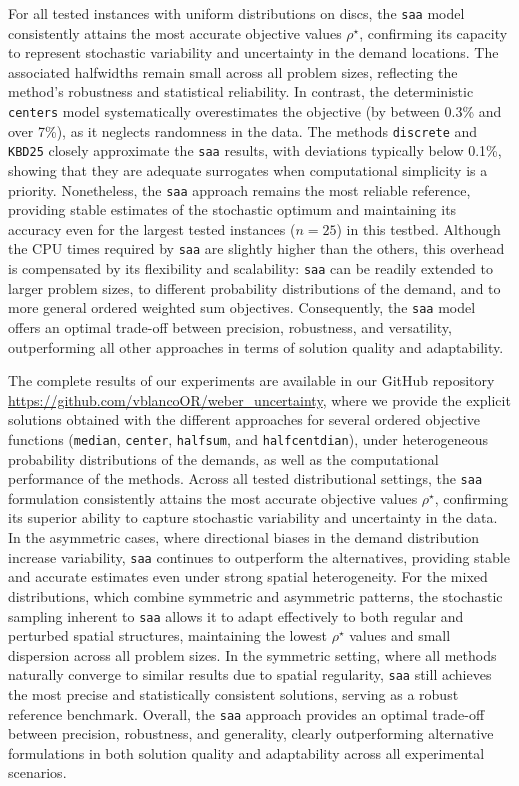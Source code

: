\documentclass[letter,11pt, reqno]{amsart}
\renewcommand{\;}{\quad}
\theoremstyle{thmstyleone}%
\theoremstyle{thmstyletwo}%
\theoremstyle{thmstylethree}%
\begin{document}
For all tested instances with uniform distributions on discs, the \texttt{saa} model consistently attains the most accurate objective values $\rho^\star$, confirming its capacity to represent stochastic variability and uncertainty in the demand locations. The associated halfwidths remain small across all problem sizes, reflecting the method’s robustness and statistical reliability. In contrast, the deterministic \texttt{centers} model systematically overestimates the objective (by between 0.3\% and over 7\%), as it neglects randomness in the data. The methods \texttt{discrete} and \texttt{KBD25}  closely approximate the \texttt{saa} results, with deviations typically below 0.1\%, showing that they are adequate surrogates when computational simplicity is a priority. Nonetheless, the \texttt{saa} approach remains the most reliable reference, providing stable estimates of the stochastic optimum and maintaining its accuracy even for the largest tested instances ($n=25$) in this testbed. Although the CPU times required by \texttt{saa} are slightly higher than the others, this overhead is compensated by its flexibility and scalability: \texttt{saa} can be readily extended to larger problem sizes, to different probability distributions of the demand, and to more general ordered weighted sum objectives. Consequently, the \texttt{saa} model offers an optimal trade-off between precision, robustness, and versatility, outperforming all other approaches in terms of solution quality and adaptability.

The complete results of our experiments are available in our GitHub repository \url{https://github.com/vblancoOR/weber_uncertainty}, where we provide the explicit solutions obtained with the different approaches for several ordered objective functions (\texttt{median}, \texttt{center}, \texttt{halfsum}, and \texttt{halfcentdian}), under heterogeneous probability distributions of the demands, as well as the computational performance of the methods. Across all tested distributional settings, the \texttt{saa} formulation consistently attains the most accurate objective values $\rho^\star$, confirming its superior ability to capture stochastic variability and uncertainty in the data. In the asymmetric cases, where directional biases in the demand distribution increase variability, \texttt{saa} continues to outperform the alternatives, providing stable and accurate estimates even under strong spatial heterogeneity. For the mixed distributions, which combine symmetric and asymmetric patterns, the stochastic sampling inherent to \texttt{saa} allows it to adapt effectively to both regular and perturbed spatial structures, maintaining the lowest $\rho^\star$ values and small dispersion across all problem sizes. In the symmetric setting, where all methods naturally converge to similar results due to spatial regularity, \texttt{saa} still achieves the most precise and statistically consistent solutions, serving as a robust reference benchmark. Overall, the \texttt{saa} approach provides an optimal trade-off between precision, robustness, and generality, clearly outperforming alternative formulations in both solution quality and adaptability across all experimental scenarios.
\end{document}
